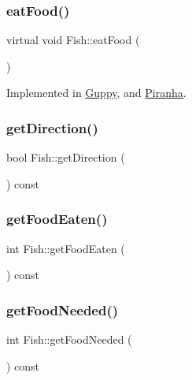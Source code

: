 \subsubsection{\texorpdfstring{eat\+Food()}{eatFood()}}
{\footnotesize\ttfamily virtual void Fish\+::eat\+Food (\begin{DoxyParamCaption}{ }\end{DoxyParamCaption})\hspace{0.3cm}{\ttfamily [pure virtual]}}



Implemented in \mbox{\hyperlink{class_guppy_a50115297f5c2f4df46e3613e09db115e}{Guppy}}, and \mbox{\hyperlink{class_piranha_a50992b83e072f8719150d302469a462f}{Piranha}}.

\mbox{\label{class_fish_a411294175d2104ba12bf205b529f59bd}} 
\subsubsection{\texorpdfstring{get\+Direction()}{getDirection()}}
{\footnotesize\ttfamily bool Fish\+::get\+Direction (\begin{DoxyParamCaption}{ }\end{DoxyParamCaption}) const}

\mbox{\label{class_fish_a43f71b5e1940fec9aee01ba7ecb7cc5b}} 
\subsubsection{\texorpdfstring{get\+Food\+Eaten()}{getFoodEaten()}}
{\footnotesize\ttfamily int Fish\+::get\+Food\+Eaten (\begin{DoxyParamCaption}{ }\end{DoxyParamCaption}) const}

\mbox{\label{class_fish_a5ebfe16e94d3e605d703efbd47aa2a07}} 
\subsubsection{\texorpdfstring{get\+Food\+Needed()}{getFoodNeeded()}}
{\footnotesize\ttfamily int Fish\+::get\+Food\+Needed (\begin{DoxyParamCaption}{ }\end{DoxyParamCaption}) const}

